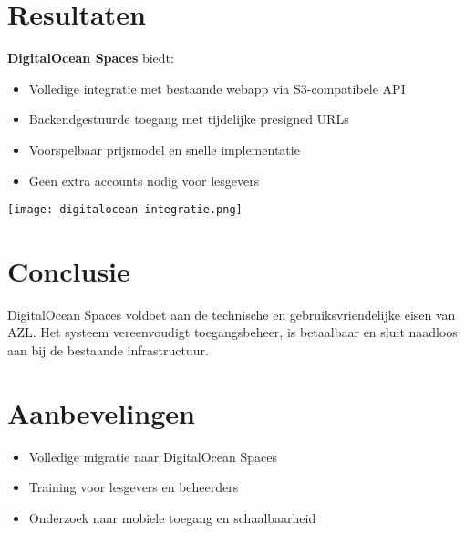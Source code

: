 \documentclass[a0,portrait]{hogent-poster}
\begin{document}
\begin{multicols}{2}
\section*{Resultaten}
\textbf{DigitalOcean Spaces} biedt:
\begin{itemize}
  \item Volledige integratie met bestaande webapp via S3-compatibele API
  \item Backendgestuurde toegang met tijdelijke presigned URLs
  \item Voorspelbaar prijsmodel en snelle implementatie
  \item Geen extra accounts nodig voor lesgevers
\end{itemize}

\begin{center}
  \captionsetup{type=figure}
  \texttt{[image: digitalocean-integratie.png]} %
\end{center}

\section*{Conclusie}
DigitalOcean Spaces voldoet aan de technische en gebruiksvriendelijke eisen van AZL. Het systeem vereenvoudigt toegangsbeheer, is betaalbaar en sluit naadloos aan bij de bestaande infrastructuur.

\section*{Aanbevelingen}
\begin{itemize}
  \item Volledige migratie naar DigitalOcean Spaces
  \item Training voor lesgevers en beheerders
  \item Onderzoek naar mobiele toegang en schaalbaarheid
\end{itemize}

\end{multicols}
\end{document}
